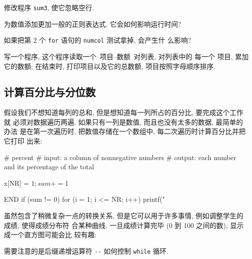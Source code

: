 \begin{exercise}
    修改程序 \verb'sum3', 使它忽略空行.
\end{exercise}
\begin{exercise}
    为数值添加更加一般的正则表达式. 它会如何影响运行时间?
\end{exercise}
\begin{exercise}
    如果把第 2 个 \verb'for' 语句的 \verb'numcol' 测试拿掉, 会产生什
    么影响?
\end{exercise}
\begin{exercise}
    写一个程序, 这个程序读取一个\ \mbox{项目}--数额\ 对列表, 对列表中的
    每一个
项目, 累加它的数额; 在结束时, 打印项目以及它的总数额, 项目按照字母顺序排序.
\end{exercise}

\subsection{计算百分比与分位数}
\label{subsec:computing_percentages_and_quantiles}

假设我们不想知道每列的总和, 但是想知道每一列所占的百分比, 要完成这个工作就
必须对数据遍历两遍. 如果只有一列是数值, 而且也没有太多的数据, 最简单的办法
是在第一次遍历时, 把数值存储在一个数组中, 每二次遍历时计算百分比并把它打印
出来:
\begin{awkcode}
     # percent
     #   input:  a column of nonnegative numbers
     #   output: each number and its percentage of the total
     
         { x[NR] = $1; sum += $1 }
     
     END { if (sum != 0)
               for (i = 1; i <= NR; i++)
                   printf("%
         }
\end{awkcode}

虽然包含了稍微复杂一点的转换关系,
但是它可以用于许多事情, 例如调整学生的成绩, 使得成绩分布符
合某种曲线. 一旦成绩计算完毕 (0 到 100 之间的数), 显示成一个直方图可能会比
较有趣:
需要注意的是后缀递增运算符 \verb'--' 如何控制 \verb'while' 循环.

